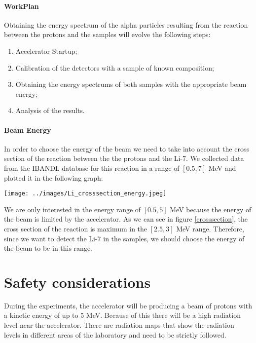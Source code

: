 \documentclass{article}
\begin{document}
\begin{multicols}{2}
\paragraph{WorkPlan}

Obtaining the energy spectrum of the alpha particles resulting from the reaction between the protons and the samples will
evolve the following steps:

\begin{enumerate}
  \item Accelerator Startup;
  \item Calibration of the detectors with a sample of known composition;
  \item Obtaining the energy spectrums of both samples with the appropriate beam energy;
  \item Analysis of the results.
\end{enumerate}

\paragraph*{Beam Energy}

In order to choose the energy of the beam we need to take into account the cross section of the reaction between the the protons and the Li-7.
We collected data from the IBANDL \cite{IAEA_EXFOR} database for this reaction in a range of $[0.5,7]$ MeV and plotted it in the following graph:

\begin{center}
  \texttt{[image: ../images/Li\_crosssection\_energy.jpeg]}
  \label{crosssection}
\end{center}

We are only interested in the energy range of $[0.5,5]$ MeV because the energy of the beam is limited by the accelerator.
As we can see in figure \ref{crosssection}, the cross section of the reaction is maximum in the $[2.5,3]$ MeV range. 
Therefore, since we want to detect the Li-7 in the samples, we should choose the energy of the beam to be in this range.

\section{Safety considerations}

During the experiments, the accelerator will be producing a beam of protons with a kinetic energy of up to 5 MeV. Because of this there will be a high radiation level near the accelerator.
There are radiation maps that show the radiation levels in different areas of the laboratory and need to be strictly followed.


\end{multicols}
\end{document}
